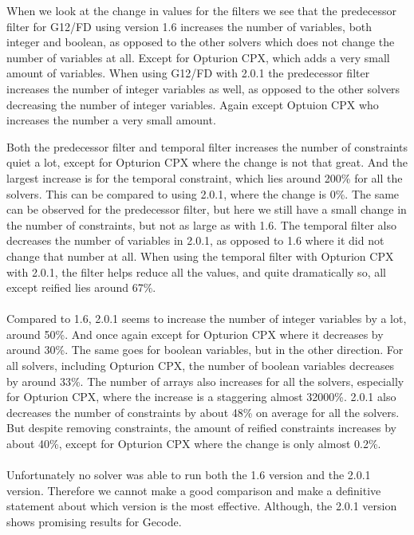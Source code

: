 







When we look at the change in values for the filters we see that the predecessor filter for G12/FD using version 1.6 increases the number of variables, both integer and boolean, as opposed to the other solvers which does not change the number of variables at all. Except for Opturion CPX, which adds a very small amount of variables. When using G12/FD with 2.0.1 the predecessor filter increases the number of integer variables as well, as opposed to the other solvers decreasing the number of integer variables. Again except Optuion CPX who increases the number a very small amount.

Both the predecessor filter and temporal filter increases the number of constraints quiet a lot, except for Opturion CPX where the change is not that great. And the largest increase is for the temporal constraint, which lies around 200\% for all the solvers. This can be compared to using 2.0.1, where the change is 0\%. The same can be observed for the predecessor filter, but here we still have a small change in the number of constraints, but not as large as with 1.6. The temporal filter also decreases the number of variables in 2.0.1, as opposed to 1.6 where it did not change that number at all. When using the temporal filter with Opturion CPX with 2.0.1, the filter helps reduce all the values, and quite dramatically so, all except reified lies around 67\%.
\\\\
Compared to 1.6, 2.0.1 seems to increase the number of integer variables by a lot, around 50\%. And once again except for Opturion CPX where it decreases by around 30\%. The same goes for boolean variables, but in the other direction. For all solvers, including Opturion CPX, the number of boolean variables decreases by around 33\%. The number of arrays also increases for all the solvers, especially for Opturion CPX, where the increase is a staggering almost 32000\%. 2.0.1 also decreases the number of constraints by about 48\% on average for all the solvers. But despite removing constraints, the amount of reified constraints increases by about 40\%, except for Opturion CPX where the change is only almost 0.2\%.
\\\\
Unfortunately no solver was able to run both the 1.6 version and the 2.0.1 version. Therefore we cannot make a good comparison and make a definitive statement about which version is the most effective. Although, the 2.0.1 version shows promising results for Gecode.

